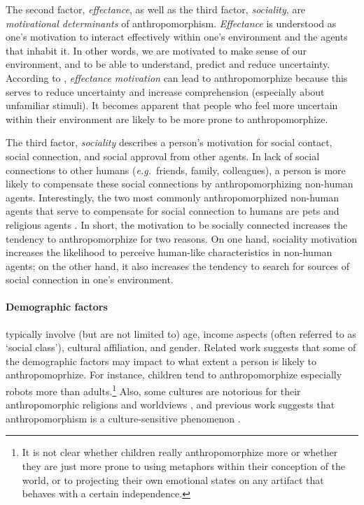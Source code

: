 \documentclass{frontiersSCNS} %
\newcommand{\eg}{{\textit{e.g.~}}}
\begin{document}
The second factor, \textit{effectance}, as well as the third factor, \textit{sociality}, are \textit{motivational determinants} of anthropomorphism. \textit{Effectance} is understood as one's motivation to interact effectively within one's environment and the agents that inhabit it. In other words, we are motivated to make sense of our environment, and to be able to understand, predict and reduce uncertainty. According to \cite{epley_seeing_2007}, \textit{effectance motivation} can lead to anthropomorphize because this serves to reduce uncertainty and increase comprehension (especially about unfamiliar stimuli). It becomes apparent that people who feel more uncertain within their environment are likely to be more prone to anthropomorphize.

The third factor, \textit{sociality} describes a person's motivation for social contact, social connection, and social approval from other agents. In lack of social connections to other humans (\eg friends, family, colleagues), a person is more likely to compensate these social connections by anthropomorphizing non-human agents. Interestingly, the two most commonly anthropomorphized non-human agents that serve to compensate for social connection to humans are pets and religious agents \citep{epley_seeing_2007}. In short, the motivation to be socially connected increases the tendency to anthropomorphize for two reasons. On one hand, sociality motivation increases the likelihood to perceive human-like characteristics in non-human agents; on the other hand, it also increases the tendency to search for sources of social connection in one's environment.


\paragraph{Demographic factors} typically involve (but are not limited to) age, income aspects (often referred to as `social class'), cultural affiliation, and gender. Related work suggests that some of the demographic factors may impact to what extent a person is likely to anthropomoprhize. For instance, children tend to anthropomorphize especially robots more than adults.\footnote{It is not clear whether children really anthropomorphize more or whether they are just more prone to using metaphors within their conception of the world, or to projecting their own emotional states on any artifact that behaves with a certain independence.} Also, some cultures are notorious for their anthropomorphic religions and worldviews \citep{epley_when_2008}, and previous work suggests that anthropomorphism is a culture-sensitive phenomenon \citep{kaplan_who_2004,bartneck_cultural_2005}. 
\end{document}
